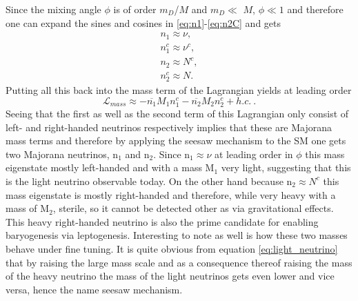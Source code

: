 Since the mixing angle $\phi$ is of order $m_D$/$M$ and $m_D\ll$ $M$, $\phi\ll1$ and therefore one can expand the sines and cosines in \eqref{eq:n1}-\eqref{eq:n2C} and gets
\begin{align}
	n_{1}\approx\nu,\\
	n_{1}^c\approx\nu^c,\\
	n_{2}\approx N^c,\\
	n_{2}^c\approx N.
\end{align}
Putting all this back into the mass term of the Lagrangian yields at leading order
\begin{equation}
	\mathcal{L}_{mass}\approx-\overline{n_1}M_1n_1^c-\overline{n_2}M_2n_2^c+h.c.\:.
\end{equation}
Seeing that the first as well as the second term of this Lagrangian only consist of left- and right-handed neutrinos respectively implies that these are Majorana mass terms and therefore by applying the seesaw mechanism to the SM one gets two Majorana neutrinos, n$_1$ and n$_2$. \newline\indent
Since n$_{1}\approx\nu$ at leading order in $\phi$ this mass eigenstate mostly left-handed and with a mass M$_1$ very light, suggesting that this is the light neutrino observable today.\newline\indent
On the other hand because n$_{2}\approx N^c$ this mass eigenstate is mostly right-handed and therefore, while very heavy with a mass of M$_2$, sterile, so it cannot be detected other as via gravitational effects. This heavy right-handed neutrino is also the prime candidate for enabling baryogenesis via leptogenesis. \newline\indent
Interesting to note as well is how these two masses behave under fine tuning. It is quite obvious from equation \eqref{eq:light_neutrino} that by raising the large mass scale and as a consequence thereof raising the mass of the heavy neutrino the mass of the light neutrinos gets even lower and vice versa, hence the name seesaw mechanism. 
